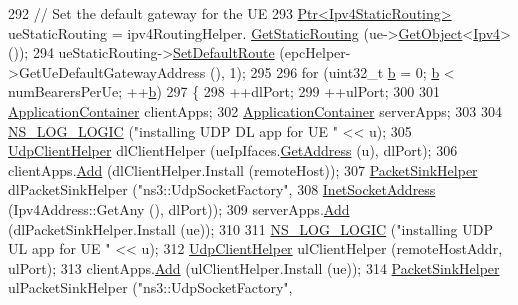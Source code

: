 \begin{DoxyCode}
292       \textcolor{comment}{// Set the default gateway for the UE}
293       \hyperlink{classns3_1_1Ptr}{Ptr<Ipv4StaticRouting>} ueStaticRouting = ipv4RoutingHelper.
      \hyperlink{classns3_1_1Ipv4StaticRoutingHelper_a731206e50d305695dac7fb2ef963a4bb}{GetStaticRouting} (ue->\hyperlink{classns3_1_1Object_a13e18c00017096c8381eb651d5bd0783}{GetObject}<\hyperlink{classns3_1_1Ipv4}{Ipv4}> ());
294       ueStaticRouting->\hyperlink{classns3_1_1Ipv4StaticRouting_aee30fa3246c2b42f122dabdff2725331}{SetDefaultRoute} (epcHelper->GetUeDefaultGatewayAddress (), 1);
295 
296       \textcolor{keywordflow}{for} (uint32\_t \hyperlink{buildings__pathloss_8m_a21ad0bd836b90d08f4cf640b4c298e7c}{b} = 0; \hyperlink{buildings__pathloss_8m_a21ad0bd836b90d08f4cf640b4c298e7c}{b} < numBearersPerUe; ++\hyperlink{buildings__pathloss_8m_a21ad0bd836b90d08f4cf640b4c298e7c}{b})
297         \{
298           ++dlPort;
299           ++ulPort;
300 
301           \hyperlink{classns3_1_1ApplicationContainer}{ApplicationContainer} clientApps;
302           \hyperlink{classns3_1_1ApplicationContainer}{ApplicationContainer} serverApps;
303 
304           \hyperlink{group__logging_ga88acd260151caf2db9c0fc84997f45ce}{NS\_LOG\_LOGIC} (\textcolor{stringliteral}{"installing UDP DL app for UE "} << u);
305           \hyperlink{classns3_1_1UdpClientHelper}{UdpClientHelper} dlClientHelper (ueIpIfaces.\hyperlink{classns3_1_1Ipv4InterfaceContainer_ae63208dcd222be986822937ee4aa828c}{GetAddress} (u), dlPort);
306           clientApps.\hyperlink{classns3_1_1ApplicationContainer_ad09ab1a1ad5849d518d5f4c262e38152}{Add} (dlClientHelper.Install (remoteHost));
307           \hyperlink{classns3_1_1PacketSinkHelper}{PacketSinkHelper} dlPacketSinkHelper (\textcolor{stringliteral}{"ns3::UdpSocketFactory"},
308                                                \hyperlink{classns3_1_1InetSocketAddress}{InetSocketAddress} (Ipv4Address::GetAny (), 
      dlPort));
309           serverApps.\hyperlink{classns3_1_1ApplicationContainer_ad09ab1a1ad5849d518d5f4c262e38152}{Add} (dlPacketSinkHelper.Install (ue));
310 
311           \hyperlink{group__logging_ga88acd260151caf2db9c0fc84997f45ce}{NS\_LOG\_LOGIC} (\textcolor{stringliteral}{"installing UDP UL app for UE "} << u);
312           \hyperlink{classns3_1_1UdpClientHelper}{UdpClientHelper} ulClientHelper (remoteHostAddr, ulPort);
313           clientApps.\hyperlink{classns3_1_1ApplicationContainer_ad09ab1a1ad5849d518d5f4c262e38152}{Add} (ulClientHelper.Install (ue));
314           \hyperlink{classns3_1_1PacketSinkHelper}{PacketSinkHelper} ulPacketSinkHelper (\textcolor{stringliteral}{"ns3::UdpSocketFactory"},

\end{DoxyCode}

